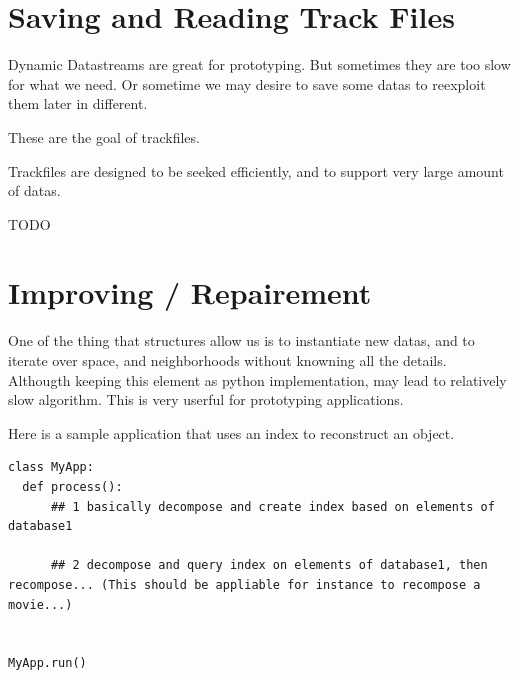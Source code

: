 \documentclass{report}
\begin{document}
\section{Saving and Reading Track Files}
Dynamic Datastreams are great for prototyping. But sometimes they are too slow for what we need.
Or sometime we may desire to save some datas to reexploit them later in different.

These are the goal of trackfiles.

Trackfiles are designed to be seeked efficiently, and to support very large amount of datas.


TODO






\section{Improving / Repairement}
One of the thing that structures allow us is to instantiate new datas, and to iterate 
over space, and neighborhoods without knowning all the details.
Althougth keeping this element as python implementation, may lead to relatively slow algorithm.
This is very userful for prototyping applications.


Here is a sample application that uses an index to reconstruct an object.





\begin{lstlisting}
class MyApp:
  def process():
      ## 1 basically decompose and create index based on elements of database1

      ## 2 decompose and query index on elements of database1, then recompose... (This should be appliable for instance to recompose a movie...)


MyApp.run()

\end{lstlisting}
\end{document}
